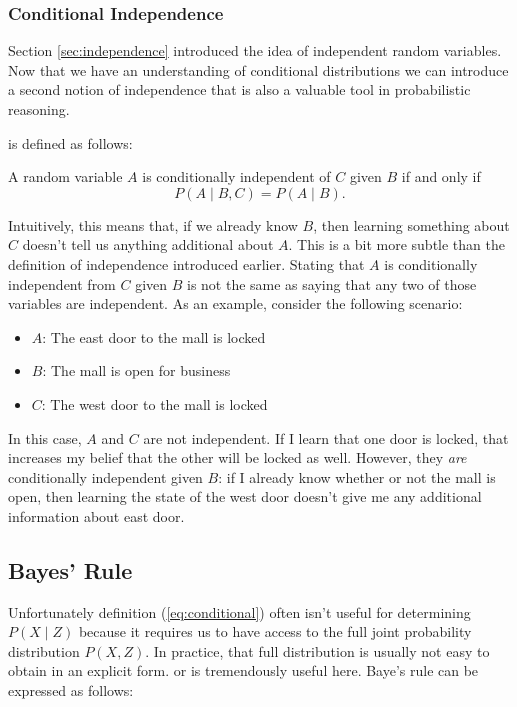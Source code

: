 \subsubsection{Conditional Independence}
Section \ref{sec:independence} introduced the idea of independent
random variables.  Now that we have an understanding of conditional
distributions we can introduce a second notion of independence that is
also a valuable tool in probabilistic reasoning.

 is defined as follows:

A random variable $A$ is conditionally independent of $C$ given $B$
if and only if
\begin{equation}
  P(A \mid B, C) = P(A \mid B).
\end{equation}

Intuitively, this means that, if we already know $B$, then learning
something about $C$ doesn't tell us anything additional about
$A$. This is a bit more subtle than the definition of independence
introduced earlier. Stating that $A$ is conditionally independent from
$C$ given $B$ is not the same as saying that any two of those
variables are independent. As an example, consider the following scenario:
\begin{itemize}
\item $A$: The east door to the mall is locked
\item $B$: The mall is open for business
\item $C$: The west door to the mall is locked
\end{itemize}
In this case, $A$ and $C$ are not independent.  If I learn that one
door is locked, that increases my belief that the other will be
locked as well. However, they \emph{are} conditionally independent
given $B$: if I already know whether or not the mall is open, then
learning the state of the west door doesn't give me any additional
information about east door.



\subsection{Bayes' Rule}

Unfortunately definition (\ref{eq:conditional}) often isn't useful
for determining $P(X \mid Z)$ because it requires us to have access to
the full joint probability distribution $P(X, Z)$.  In practice, that
full distribution is usually not easy to obtain in an explicit form.
 or  is tremendously useful
here.  Baye's rule can be expressed as follows:

